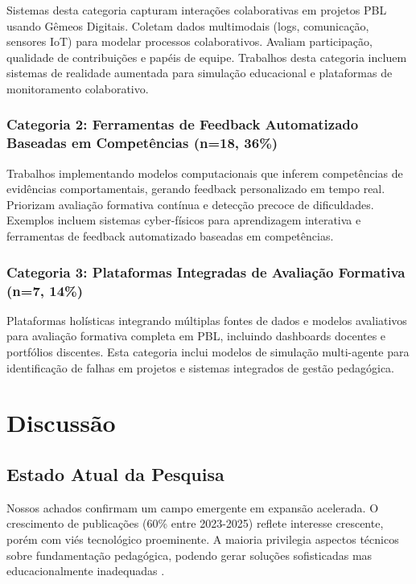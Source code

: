 \documentclass[english, spanish, brazilian]{RBIEarticle} %
\begin{document}
Sistemas desta categoria capturam interações colaborativas em projetos PBL usando Gêmeos Digitais. Coletam dados multimodais (logs, comunicação, sensores IoT) para modelar processos colaborativos. Avaliam participação, qualidade de contribuições e papéis de equipe. Trabalhos desta categoria incluem sistemas de realidade aumentada para simulação educacional e plataformas de monitoramento colaborativo.

\subsubsection{Categoria 2: Ferramentas de Feedback Automatizado Baseadas em Competências (n=18, 36\%)}

Trabalhos implementando modelos computacionais que inferem competências de evidências comportamentais, gerando feedback personalizado em tempo real. Priorizam avaliação formativa contínua e detecção precoce de dificuldades. Exemplos incluem sistemas cyber-físicos para aprendizagem interativa e ferramentas de feedback automatizado baseadas em competências.

\subsubsection{Categoria 3: Plataformas Integradas de Avaliação Formativa (n=7, 14\%)}

Plataformas holísticas integrando múltiplas fontes de dados e modelos avaliativos para avaliação formativa completa em PBL, incluindo dashboards docentes e portfólios discentes. Esta categoria inclui modelos de simulação multi-agente para identificação de falhas em projetos e sistemas integrados de gestão pedagógica.



\section{Discussão}

\subsection{Estado Atual da Pesquisa}

Nossos achados confirmam um campo emergente em expansão acelerada. O crescimento de publicações (60\% entre 2023-2025) reflete interesse crescente, porém com viés tecnológico proeminente. A maioria privilegia aspectos técnicos sobre fundamentação pedagógica, podendo gerar soluções sofisticadas mas educacionalmente inadequadas \parencite{Gibson1977}.
\end{document}
